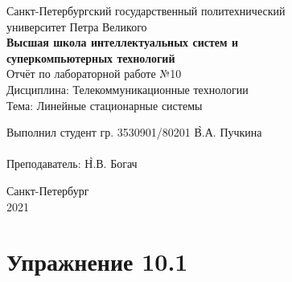 \documentclass[a4paper, 14pt]{extarticle}
\begin{document}
    \begin{center}
        \begin{center}
            \hfill \break
            \normalsize{Санкт-Петербургский государственный политехнический}\\
            \normalsize{университет Петра Великого}\\
            \hfill \break
            \normalsize{\textbf{Высшая школа интеллектуальных систем и}}\\
            \normalsize{\textbf{суперкомпьютерных технологий}}\\
            \hfill \break
            \hfill \break
            \hfill \break
            \hfill \break
            \hfill \break
            \normalsize{Отчёт по лабораторной работе №10}\\
            \normalsize{Дисциплина: Телекоммуникационные технологии}\\
            \normalsize{Тема: Линейные стационарные системы}\\
        \end{center}
        \hfill \break
        \hfill \break
        \hfill \break
        \hfill \break
        \hfill \break
        \hfill \break
        \hfill \break
        \hfill \break
        \hfill \break
        \hfill \break
        \begin{tabbing}
            Выполнил студент гр. 3530901/80201 \`В.А. Пучкина\\
            \\
            Преподаватель: \`Н.В. Богач\\
        \end{tabbing}
        \hfill \break
        \hfill \break
        \hfill \break
        \hfill \break
        \begin{center}
            Санкт-Петербург\\
            2021
        \end{center}
        \thispagestyle{empty}
    \end{center}

    \newpage
    \tableofcontents

    \newpage
    \listoffigures

    \newpage
    \lstlistoflistings

    \newpage
    \section{Упражнение 10.1}
    \label{sec:task1}
\end{document}
